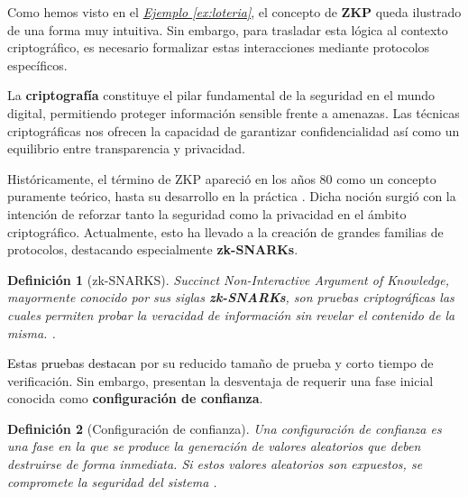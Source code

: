 \documentclass[a4paper,12pt]{report}
\newtheorem{definicion}{Definición}
\begin{document}
	\vspace{0.25cm}
	
	\noindent Como hemos visto en el \hyperref[ex:loteria]{\textit{Ejemplo \ref{ex:loteria}}}, el concepto de \textbf{ZKP} queda ilustrado de una forma muy intuitiva. Sin embargo, para trasladar esta lógica al contexto criptográfico, es necesario formalizar estas interacciones mediante protocolos específicos.
	
	\vspace{0.25cm}
	
	\noindent La \textbf{criptografía} constituye el pilar fundamental de la seguridad en el mundo digital, permitiendo proteger información sensible frente a amenazas. Las técnicas criptográficas nos ofrecen la capacidad de garantizar confidencialidad así como un equilibrio entre transparencia y privacidad.
	
	\vspace{0.25cm}
	
	\noindent Históricamente, el término de ZKP apareció en los años 80 como un concepto puramente teórico, hasta su desarrollo en la práctica \cite{nervos_zkp}. Dicha noción surgió con la intención de reforzar tanto la seguridad como la privacidad en el ámbito criptográfico. Actualmente, esto ha llevado a la creación de grandes familias de protocolos, destacando especialmente \textbf{zk-SNARKs}.
	
	
	\begin{definicion}[zk-SNARKS]
		
		\noindent \textit{Succinct Non-Interactive Argument of Knowledge}, mayormente conocido por sus siglas \textbf{zk-SNARKs}, son pruebas criptográficas las cuales permiten probar la veracidad de información sin revelar el contenido de la misma. \cite{binance_academy_zk}.
		
		\label{def:zk-snarks}
	\end{definicion}
	
	\vspace{0.25cm}
	\noindent \textcolor{black}{Estas pruebas destacan} por su reducido tamaño de prueba y corto tiempo de verificación. Sin embargo, presentan la desventaja de requerir una fase inicial conocida como \textbf{configuración de confianza}.
	
	\begin{definicion}[Configuración de confianza]
		
		\noindent Una configuración de confianza es una fase en la que se produce la generación de valores aleatorios que deben destruirse de forma inmediata. Si estos valores aleatorios son expuestos, se compromete la seguridad del sistema \cite{binance_academy_zk}.
		
		
		\label{def:confidence-configuration}
	\end{definicion}
	
\end{document}
